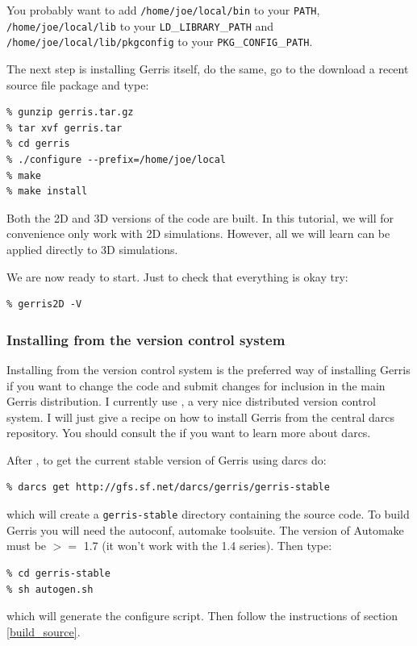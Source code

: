 \documentclass[a4paper]{article}
\newcommand{\gfsweb}{http://gfs.sf.net}
\begin{document}
You probably want to add {\tt /home/joe/local/bin} to your {\tt PATH},
{\tt /home/joe/local/lib} to your {\tt LD}\_{\tt LIBRARY}\_{\tt PATH}
and {\tt /home/joe/local/lib/pkgconfig} to your {\tt PKG}\_{\tt CONFIG}\_{\tt PATH}.

The next step is installing Gerris itself, do the same, go to the
\htmladdnormallinkfoot{Gerris web site}{\gfsweb} download a recent source file
package and type:
\begin{verbatim}
% gunzip gerris.tar.gz
% tar xvf gerris.tar
% cd gerris
% ./configure --prefix=/home/joe/local
% make
% make install
\end{verbatim}
Both the 2D and 3D versions of the code are built. In this tutorial,
we will for convenience only work with 2D simulations. However, all we
will learn can be applied directly to 3D simulations.

We are now ready to start. Just to check that everything is okay try:
\begin{verbatim}
% gerris2D -V
\end{verbatim}

\subsubsection{Installing from the version control system}
\label{build_darcs}

Installing from the version control system is the preferred way of installing
Gerris if you want to change the code and submit changes for inclusion
in the main Gerris distribution. I currently use
, a very
nice distributed version control system. I will just give a recipe on
how to install Gerris from the central darcs repository. You should
consult the  if you want to learn
more about darcs. 

After , to get the
current stable version of Gerris using darcs do:
\begin{verbatim}
% darcs get http://gfs.sf.net/darcs/gerris/gerris-stable
\end{verbatim}
which will create a {\tt gerris-stable} directory containing the
source code. To build Gerris you will need the autoconf, automake
toolsuite. The version of Automake must be $>=$ 1.7 (it won't work
with the 1.4 series). Then type:
\begin{verbatim}
% cd gerris-stable
% sh autogen.sh
\end{verbatim}
which will generate the configure script. Then follow the instructions
of section \ref{build_source}.
\end{document}
